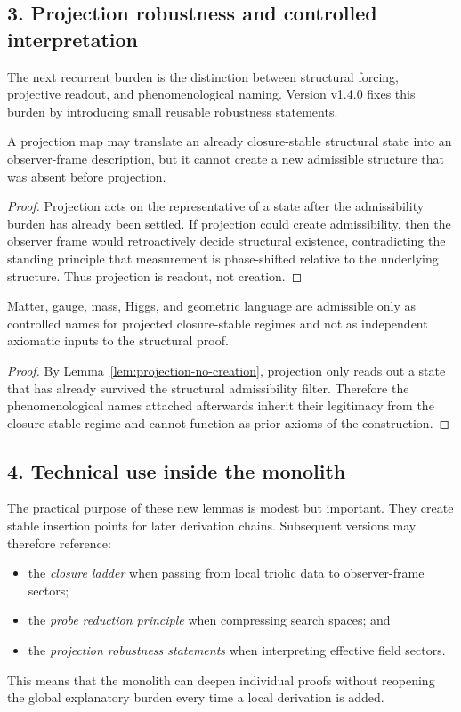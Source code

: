 \subsection*{3. Projection robustness and controlled interpretation}
The next recurrent burden is the distinction between structural forcing,
projective readout, and phenomenological naming. Version v1.4.0 fixes
this burden by introducing small reusable robustness statements.

\begin{lemma}
\label{lem:projection-no-creation}
A projection map may translate an already closure-stable structural state into
an observer-frame description, but it cannot create a new admissible structure
that was absent before projection.
\end{lemma}

\begin{proof}
Projection acts on the representative of a state after the admissibility burden
has already been settled. If projection could create admissibility, then the
observer frame would retroactively decide structural existence, contradicting
the standing principle that measurement is phase-shifted relative to the
underlying structure. Thus projection is readout, not creation.
\end{proof}

\begin{corollary}
\label{cor:interpretation-discipline}
Matter, gauge, mass, Higgs, and geometric language are admissible only as
controlled names for projected closure-stable regimes and not as independent
axiomatic inputs to the structural proof.
\end{corollary}

\begin{proof}
By Lemma~\ref{lem:projection-no-creation}, projection only reads out a state
that has already survived the structural admissibility filter. Therefore the
phenomenological names attached afterwards inherit their legitimacy from the
closure-stable regime and cannot function as prior axioms of the construction.
\end{proof}

\subsection*{4. Technical use inside the monolith}
The practical purpose of these new lemmas is modest but important. They create
stable insertion points for later derivation chains. Subsequent versions may
therefore reference:
\begin{itemize}[leftmargin=2em]
  \item the \emph{closure ladder} when passing from local triolic data to
  observer-frame sectors;
  \item the \emph{probe reduction principle} when compressing search spaces; and
  \item the \emph{projection robustness statements} when interpreting effective
  field sectors.
\end{itemize}
This means that the monolith can deepen individual proofs without reopening the
global explanatory burden every time a local derivation is added.

